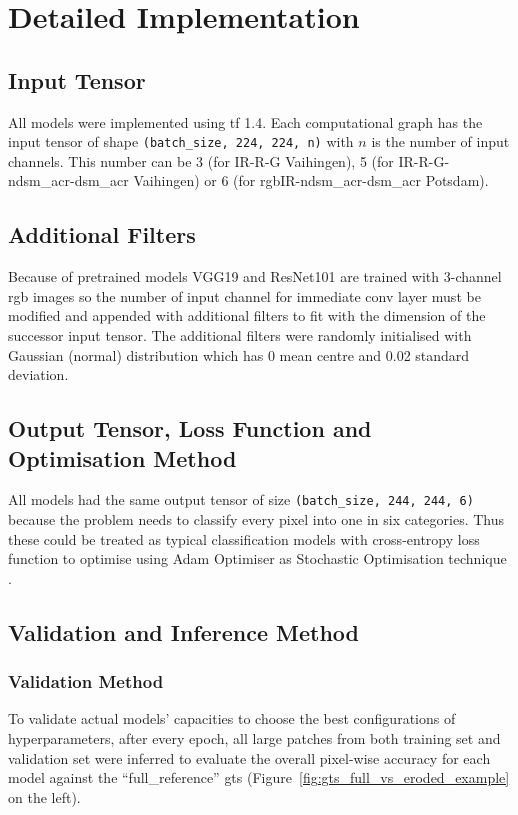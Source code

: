 \section{Detailed Implementation}
\subsection{Input Tensor}
All models were implemented using \gls{tf} 1.4. Each computational graph has
the input tensor of shape \texttt{(batch\_size, 224, 224, n)} with $n$ is the
number of input channels. This number can be 3 (for IR-R-G Vaihingen), 5 (for
IR-R-G-n\acrshort{dsm_acr}-\acrshort{dsm_acr} Vaihingen) or 6 (for
\acrshort{rgb}IR-n\acrshort{dsm_acr}-\acrshort{dsm_acr} Potsdam).

\subsection{Additional Filters}
Because of pretrained models VGG19 and ResNet101 are trained with 3-channel
\acrshort{rgb} images so the number of input channel for immediate
\acrshort{conv} layer must be modified and appended with additional filters to
fit with the dimension of the successor input tensor. The additional filters
were randomly initialised with Gaussian (normal) distribution which has 0 mean
centre and 0.02 standard deviation.

\subsection{Output Tensor, Loss Function and Optimisation Method}
All models had the same output tensor of size \texttt{(batch\_size, 244, 244,
6)} because the problem needs to classify every pixel into one in six
categories. Thus these could be treated as typical classification models with
cross-entropy loss function to optimise using Adam Optimiser as Stochastic
Optimisation technique \cite{DBLP:journals/corr/KingmaB14}.

\subsection{Validation and Inference Method}
\subsubsection{Validation Method}
To validate actual models' capacities to choose the best configurations of
hyperparameters, after every epoch, all large patches from both training set
and validation set were inferred to evaluate the overall pixel-wise accuracy
for each model against the ``full\_reference'' \gls{gt}s
(Figure~\ref{fig:gts_full_vs_eroded_example} on the left).

